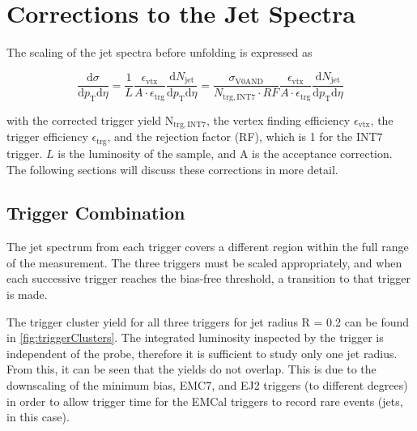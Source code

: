 \section{Corrections to the Jet Spectra}
\label{ch:Corrections}

The scaling of the jet spectra before unfolding is expressed as

\begin{equation}
    \frac{\mathrm{d}\sigma}{\mathrm{d}p_\mathrm{T} \mathrm{d}\eta} = \frac{1}{L} \frac{\epsilon_\mathrm{vtx}}{A\cdot\epsilon_\mathrm{trg}}\frac{\mathrm{d}N_\mathrm{jet}}{\mathrm{d}p_\mathrm{T} \mathrm{d}\eta} = \frac{\sigma_\mathrm{V0AND}}{N_\mathrm{trg,INT7}\cdot RF} \frac{\epsilon_\mathrm{vtx}}{A\cdot\epsilon_\mathrm{trg}}\frac{\mathrm{d}N_\mathrm{jet}}{\mathrm{d}p_\mathrm{T} \mathrm{d}\eta}
    \label{eq:corrraweq}
\end{equation}    

\noindent
with the corrected trigger yield N$_\mathrm{trg,INT7}$, the vertex finding efficiency $\epsilon_\mathrm{vtx}$, the trigger efficiency $\epsilon_\mathrm{trg}$, and the rejection factor (RF), which is 1 for the INT7 trigger. $L$ is the luminosity of the sample, and A is the acceptance correction. The following sections will discuss these corrections in more detail.

\subsection{Trigger Combination}
\label{sec:Trigger Combination}

The jet spectrum from each trigger covers a different region within the full \pT range of the measurement. The three triggers must be scaled appropriately, and when each successive trigger reaches the bias-free threshold, a transition to that trigger is made. 

The trigger cluster yield for all three triggers for jet radius R = 0.2 can be found in \ref{fig:triggerClusters}. The integrated luminosity inspected by the trigger is independent of the probe, therefore it is sufficient to study only one jet radius. From this, it can be seen that the yields do not overlap. This is due to the downscaling of the minimum bias, EMC7, and EJ2 triggers (to different degrees) in order to allow trigger time for the EMCal triggers to record rare events (jets, in this case).

